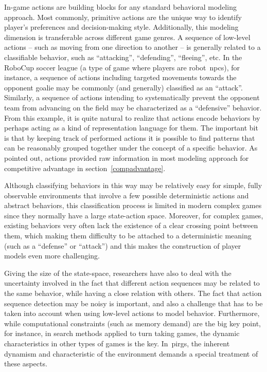 In-game actions are building blocks for any standard behavioral modeling approach. Most commonly, primitive actions are the unique way to identify player's preferences and decision-making style. Additionally, this modeling dimension is transferable across different game genres. A sequence of low-level actions -- such as moving from one direction to another -- is generally related to a classifiable behavior, such as ``attacking'', ``defending'', ``fleeing'', etc. In the RoboCup soccer league (a type of game where players are robot~\glspl{npc}), for instance, a sequence of actions including targeted movements towards the opponent goalie may be commonly (and generally) classified as an ``attack''. Similarly, a sequence of actions intending to systematically prevent the opponent team from advancing on the field may be characterized as a ``defensive'' behavior. From this example, it is quite natural to realize that actions encode behaviors by perhaps acting as a kind of representation language for them. The important bit is that by keeping track of performed actions it is possible to find patterns that can be reasonably grouped together under the concept of a specific behavior. As pointed out, actions provided raw information in most modeling approach for competitive advantage in section~\ref{compadvantage}.

Although classifying behaviors in this way may be relatively easy for simple, fully observable environments that involve a few possible deterministic actions and abstract behaviors, this classification process is limited in modern complex games since they normally have a large state-action space. Moreover, for complex games, existing behaviors very often lack the existence of a clear crossing point between them, which making them difficulty to be attached to a deterministic meaning (such as a ``defense'' or ``attack'')  and this makes the construction of player models even more challenging.

Giving the size of the state-space, researchers have also to deal with the uncertainty involved in the fact that different action sequences may be related to the same behavior, while having a close relation with others. The fact that action sequence detection may be noisy is important, and also a challenge that has to be taken into account when using low-level actions to model behavior.  Furthermore, while computational constraints (such as memory demand) are the big key point, for instance, in search methods applied to turn taking games, the dynamic characteristics in other types of games is the key. In~\glspl{pirg}, the inherent dynamism and characteristic of the environment demands a special treatment of these aspects.

